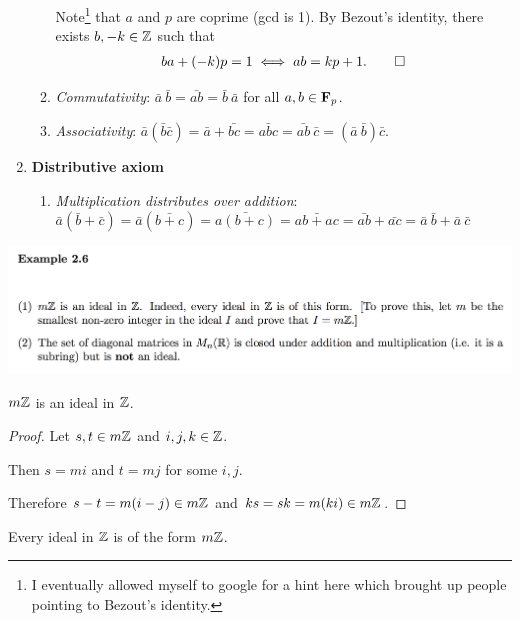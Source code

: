 \begin{enumerate}
\begin{enumerate}
    Note\footnote{I eventually allowed myself to google for a hint here which
      brought up people pointing to Bezout's identity.} that $a$ and $p$ are
    coprime (gcd is 1). By Bezout's identity, there exists $b, -k \in \mathbb{Z}$
    such that
    \begin{align*}
      ba + (-k)p = 1 \iff ab = kp + 1. \qed
    \end{align*}


  \item \textit{Commutativity}:
    $\bar a ~ \bar b = \bar{ab} = \bar{b} ~ \bar{a}$ for all $a, b \in \mathbf{F}_p$.
  \item \textit{Associativity}:
    $\bar a (\bar b \bar c) = \bar a + \bar {bc} = \bar{abc} =
    \bar{ab}~\bar{c} = (\bar a ~ \bar b) \bar{c}$.
  \end{enumerate}
\item \textbf{Distributive axiom}
  \begin{enumerate}
  \item \textit{Multiplication distributes over addition}: $\bar a (\bar b + \bar c) = \bar a (\bar{b + c}) = \bar{a(b+c)} = \bar{ab +
      ac} = \bar{ab} + \bar{ac} = \bar{a}~\bar{b} + \bar{a}~\bar{c}$
  \end{enumerate}
\end{enumerate}

\newpage

\begin{mdframed}
  \includegraphics[width=400pt]{img/linear-algebra-eg-2-6.png}
\end{mdframed}

\begin{claim*}
  $m\mathbb{Z}$ is an ideal in $\mathbb{Z}$.
\end{claim*}

\begin{proof}Let $s, t \in m\mathbb{Z}$ and $i, j, k \in \mathbb{Z}$.

  Then $s = mi$ and $t = mj$ for some $i, j$.

  Therefore $s - t = m(i - j) \in m\mathbb{Z}$ and $ks = sk = m(ki) \in m\mathbb{Z}$.
\end{proof}

\begin{claim*}
  Every ideal in $\mathbb{Z}$ is of the form $m\mathbb{Z}$.
\end{claim*}

